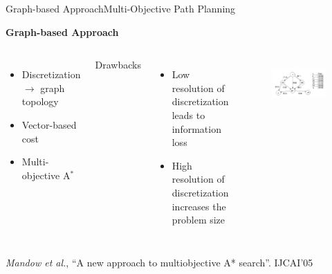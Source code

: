 \begin{frame}{Graph-based Approach}{Multi-Objective Path Planning}

{\bf Graph-based Approach}

\begin{columns}
\begin{itemize}
\item Discretization $ \rightarrow $ graph topology
\item Vector-based cost
\item Multi-objective A$ ^{*}$
\end{itemize}
Drawbacks
\begin{itemize}
\item Low resolution of discretization leads to information loss
\item High resolution of discretization increases the problem size
\end{itemize}
	\begin{figure}
		\centering
		\includegraphics[width=\linewidth]{figure/graph_based_solution.png}
		\label{fig:graph_based_solution}
	\end{figure}
\end{columns}

\vfill
\vfill
\vfill

{\tiny {\it Mandow et al.}, ``A new approach to multiobjective A* search''. IJCAI'05}
\clearpage

\end{frame}


